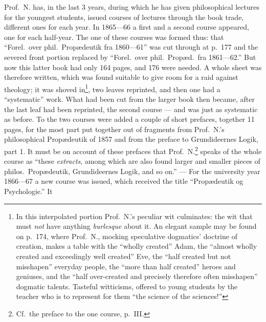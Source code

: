 \documentclass[12pt,a4paper]{book}
\begin{document}
Prof.\ N. has, in the last 3 years, during which he has given philosophical
lectures for the youngest students, issued courses of lectures through the book
trade, different ones for each year. In 1865---66 a first and a second course
appeared, one for each half-year. The one of these courses was formed thus: that
``Forel.\ over phil.\ Propædeutik fra 1860---61'' was cut through at p.\ 177 and
the severed front portion replaced by ``Forel.\ over phil.\ Propæd.\ fra
1861---62.'' But now this latter book had only 164 pages, and 176 were needed. A
whole sheet was therefore written, which was found suitable to give room
for a raid against theology; it was shoved in\footnote{%
  In this interpolated portion Prof.\ N.'s peculiar wit culminates: the wit that
  must \emph{not} have anything \emph{burlesque} about it. An elegant sample may
  be found on p.\ 174, where Prof.\ N., mocking speculative dogmatics' doctrine
  of creation, makes a table with the ``wholly created'' Adam, the ``almost
  wholly created and exceedingly well created'' Eve, the ``half created but not
  misshapen'' everyday people, the ``more than half created'' heroes and
  geniuses, and the ``half over-created and precisely therefore often
  misshapen'' dogmatic talents. Tasteful witticisms, offered to young students
  by the teacher who is to represent for them ``the science of the sciences!''},
two leaves reprinted, and then one had a ``systematic'' work. What had been cut
from the larger book then became, after the last leaf had been reprinted, the
second course --- and was just as systematic as before. To the two courses were
added a couple of short prefaces, together 11 pages, for the most part put
together out of fragments from Prof.\ N.'s philosophical Propædeutik of 1857 and
from the preface to Grundideernes Logik, part 1. It must be on account of these
prefaces that Prof.\ N.\footnote{%
  Cf.\ the preface to the one course, p.\ III.}
speaks of the whole course as ``these \emph{extracts}, among
which are also found larger and smaller pieces of philos.\ Propædeutik,
Grundideernes Logik, and so on.'' --- For the university year 1866---67 a new
course was issued, which received the title ``Propædeutik og Psychologie.'' It
\end{document}
